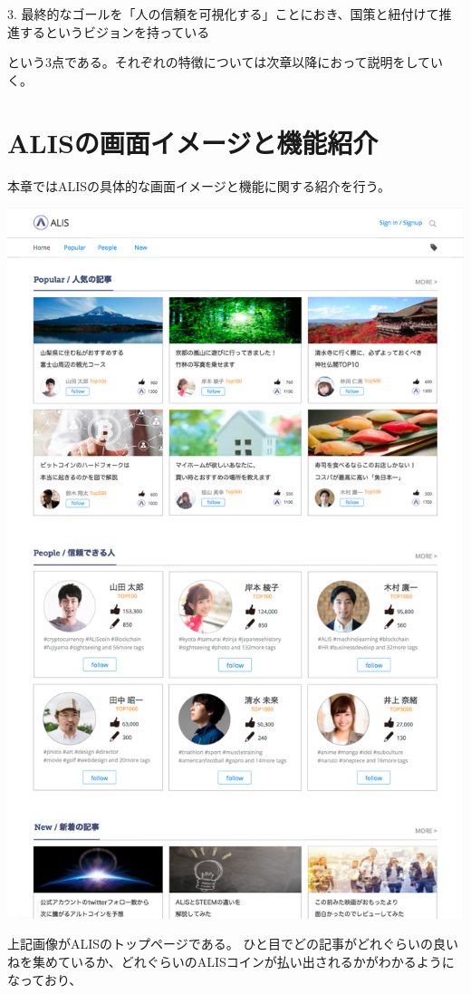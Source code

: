 \documentclass{jsarticle}
\begin{document}
3. 最終的なゴールを「人の信頼を可視化する」ことにおき、国策と紐付けて推進するというビジョンを持っている

という3点である。それぞれの特徴については次章以降におって説明をしていく。
\section{ALISの画面イメージと機能紹介}
本章ではALISの具体的な画面イメージと機能に関する紹介を行う。
\begin{center}
	\includegraphics[scale=0.4]{img/ALIS-service-image.png}
\end{center}
上記画像がALISのトップページである。
ひと目でどの記事がどれぐらいの良いねを集めているか、どれぐらいのALISコインが払い出されるかがわかるようになっており、
\end{document}
